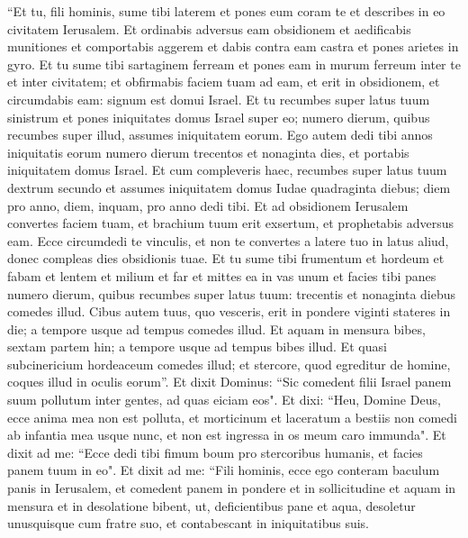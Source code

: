 \begin{biblechapter}  
\verse “Et tu, fili hominis, sume tibi laterem et pones eum coram te et describes in eo civitatem Ierusalem. 
\verse Et ordinabis adversus eam obsidionem et aedificabis munitiones et comportabis aggerem et dabis contra eam castra et pones arietes in gyro. 
\verse Et tu sume tibi sartaginem ferream et pones eam in murum ferreum inter te et inter civitatem; et obfirmabis faciem tuam ad eam, et erit in obsidionem, et circumdabis eam: signum est domui Israel. 
\verse Et tu recumbes super latus tuum sinistrum et pones iniquitates domus Israel super eo; numero dierum, quibus recumbes super illud, assumes iniquitatem eorum. 
\verse Ego autem dedi tibi annos iniquitatis eorum numero dierum trecentos et nonaginta dies, et portabis iniquitatem domus Israel. 
\verse Et cum compleveris haec, recumbes super latus tuum dextrum secundo et assumes iniquitatem domus Iudae quadraginta diebus; diem pro anno, diem, inquam, pro anno dedi tibi. 
\verse Et ad obsidionem Ierusalem convertes faciem tuam, et brachium tuum erit exsertum, et prophetabis adversus eam. 
\verse Ecce circumdedi te vinculis, et non te convertes a latere tuo in latus aliud, donec compleas dies obsidionis tuae. 
\verse Et tu sume tibi frumentum et hordeum et fabam et lentem et milium et far et mittes ea in vas unum et facies tibi panes numero dierum, quibus recumbes super latus tuum: trecentis et nonaginta diebus comedes illud. 
\verse Cibus autem tuus, quo vesceris, erit in pondere viginti stateres in die; a tempore usque ad tempus comedes illud. 
\verse Et aquam in mensura bibes, sextam partem hin; a tempore usque ad tempus bibes illud. 
\verse Et quasi subcinericium hordeaceum comedes illud; et stercore, quod egreditur de homine, coques illud in oculis eorum”. 
\verse Et dixit Dominus: “Sic comedent filii Israel panem suum pollutum inter gentes, ad quas eiciam eos". 
\verse Et dixi: “Heu, Domine Deus, ecce anima mea non est polluta, et morticinum et laceratum a bestiis non comedi ab infantia mea usque nunc, et non est ingressa in os meum caro immunda". 
\verse Et dixit ad me: “Ecce dedi tibi fimum boum pro stercoribus humanis, et facies panem tuum in eo". 
\verse Et dixit ad me: “Fili hominis, ecce ego conteram baculum panis in Ierusalem, et comedent panem in pondere et in sollicitudine et aquam in mensura et in desolatione bibent, 
\verse ut, deficientibus pane et aqua, desoletur unusquisque cum fratre suo, et contabescant in iniquitatibus suis. 
\end{biblechapter}

